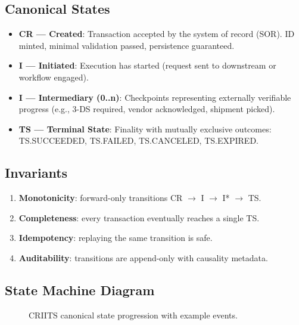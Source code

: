 \documentclass[11pt]{article}
\begin{document}
\subsection{Canonical States}
\begin{itemize}[leftmargin=*]
\item \textbf{CR — Created}: Transaction accepted by the system of record (SOR). ID minted, minimal validation passed, persistence guaranteed.
\item \textbf{I — Initiated}: Execution has started (request sent to downstream or workflow engaged).
\item \textbf{I — Intermediary (0..n)}: Checkpoints representing externally verifiable progress (e.g., 3-DS required, vendor acknowledged, shipment picked).
\item \textbf{TS — Terminal State}: Finality with mutually exclusive outcomes: TS.SUCCEEDED, TS.FAILED, TS.CANCELED, TS.EXPIRED.
\end{itemize}

\subsection{Invariants}
\begin{enumerate}[leftmargin=*]
\item \textbf{Monotonicity}: forward-only transitions CR $\to$ I $\to$ I* $\to$ TS.
\item \textbf{Completeness}: every transaction eventually reaches a single TS.
\item \textbf{Idempotency}: replaying the same transition is safe.
\item \textbf{Auditability}: transitions are append-only with causality metadata.
\end{enumerate}

\subsection{State Machine Diagram}
\begin{figure}[h]
\centering
{}
\caption{CRIITS canonical state progression with example events.}
\end{figure}
\end{document}
